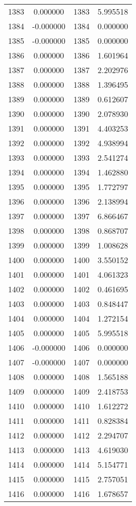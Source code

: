 \documentclass[12pt]{article}
\begin{document}
\begin{longtable}{@{}cccc@{}}
1383 & 0.000000 & 1383 & 5.995518 \\
1384 & -0.000000 & 1384 & 0.000000 \\
1385 & -0.000000 & 1385 & 0.000000 \\
1386 & 0.000000 & 1386 & 1.601964 \\
1387 & 0.000000 & 1387 & 2.202976 \\
1388 & 0.000000 & 1388 & 1.396495 \\
1389 & 0.000000 & 1389 & 0.612607 \\
1390 & 0.000000 & 1390 & 2.078930 \\
1391 & 0.000000 & 1391 & 4.403253 \\
1392 & 0.000000 & 1392 & 4.938994 \\
1393 & 0.000000 & 1393 & 2.541274 \\
1394 & 0.000000 & 1394 & 1.462880 \\
1395 & 0.000000 & 1395 & 1.772797 \\
1396 & 0.000000 & 1396 & 2.138994 \\
1397 & 0.000000 & 1397 & 6.866467 \\
1398 & 0.000000 & 1398 & 0.868707 \\
1399 & 0.000000 & 1399 & 1.008628 \\
1400 & 0.000000 & 1400 & 3.550152 \\
1401 & 0.000000 & 1401 & 4.061323 \\
1402 & 0.000000 & 1402 & 0.461695 \\
1403 & 0.000000 & 1403 & 0.848447 \\
1404 & 0.000000 & 1404 & 1.272154 \\
1405 & 0.000000 & 1405 & 5.995518 \\
1406 & -0.000000 & 1406 & 0.000000 \\
1407 & -0.000000 & 1407 & 0.000000 \\
1408 & 0.000000 & 1408 & 1.565188 \\
1409 & 0.000000 & 1409 & 2.418753 \\
1410 & 0.000000 & 1410 & 1.612272 \\
1411 & 0.000000 & 1411 & 0.828384 \\
1412 & 0.000000 & 1412 & 2.294707 \\
1413 & 0.000000 & 1413 & 4.619030 \\
1414 & 0.000000 & 1414 & 5.154771 \\
1415 & 0.000000 & 1415 & 2.757051 \\
1416 & 0.000000 & 1416 & 1.678657 \\

\end{longtable}
\end{document}
